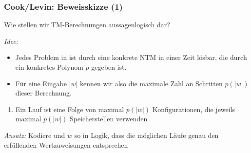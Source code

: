\documentclass[aspectratio=1610,onlymath]{beamer}
\begin{document}
\begin{frame}\frametitle{Cook/Levin: Beweisskizze (1)}

\alert{Wie stellen wir TM-Berechnungen aussagenlogisch dar?}
\bigskip

\emph{Idee:}
\begin{itemize}
\item Jedes Problem in  ist durch eine konkrete NTM  in einer Zeit lösbar, die durch ein konkretes Polynom $p$ gegeben ist.
\item Für eine Eingabe $|w|$ kennen wir also die maximale Zahl an Schritten $p(|w|)$ dieser Berechnung.
\end{itemize}
\begin{enumerate}[$\leadsto$]
\item Ein Lauf ist eine Folge von maximal $p(|w|)$ Konfigurationen, die jeweils maximal $p(|w|)$ Speicherstellen verwenden
\end{enumerate}
\bigskip

\emph{Ansatz:} Kodiere  und $w$ so in Logik, dass die möglichen Läufe genau den erfüllenden Wertzuweisungen entsprechen

\end{frame}
\end{document}
